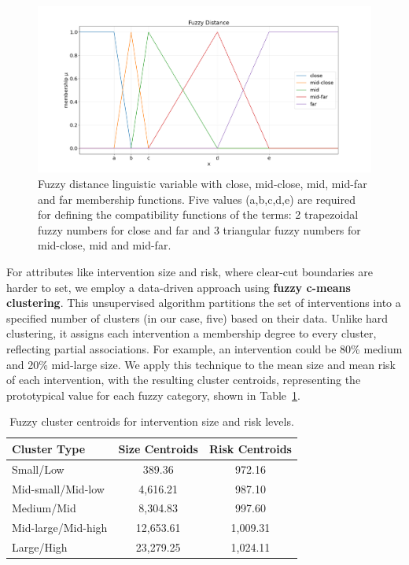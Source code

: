 \begin{figure}[!ht]
    \centering
    \includegraphics[width=\linewidth]{ch3/figures/Fuzzy distance.png}
    \caption{Fuzzy distance linguistic variable with close, mid-close, mid, mid-far and far membership functions. Five values (a,b,c,d,e) are required for defining the compatibility functions of the terms: 2 trapezoidal fuzzy numbers for close and far and 3 triangular fuzzy numbers for mid-close, mid and mid-far.}
    \label{fig:fuzzy_distance}
    \end{figure}

For attributes like intervention size and risk, where clear-cut boundaries are harder to set, we employ a data-driven approach using \textbf{fuzzy c-means clustering}. This unsupervised algorithm partitions the set of interventions into a specified number of clusters (in our case, five) based on their data. Unlike hard clustering, it assigns each intervention a membership degree to every cluster, reflecting partial associations. For example, an intervention could be 80\% medium and 20\% mid-large size. We apply this technique to the mean size and mean risk of each intervention, with the resulting cluster centroids, representing the prototypical value for each fuzzy category, shown in Table~\ref{tab:fuzzy_centroids}.

\begin{table}[!ht]
    \centering
    \begin{tabular}{lcc}
    \hline
    \textbf{Cluster Type} & \textbf{Size Centroids} & \textbf{Risk Centroids} \\
    \hline
    Small/Low & 389.36 & 972.16 \\
    Mid-small/Mid-low & 4,616.21 & 987.10 \\
    Medium/Mid & 8,304.83 & 997.60 \\
    Mid-large/Mid-high & 12,653.61 & 1,009.31 \\
    Large/High & 23,279.25 & 1,024.11 \\
    \hline
    \end{tabular}
    \caption{Fuzzy cluster centroids for intervention size and risk levels.}
    \label{tab:fuzzy_centroids}
    \end{table}

